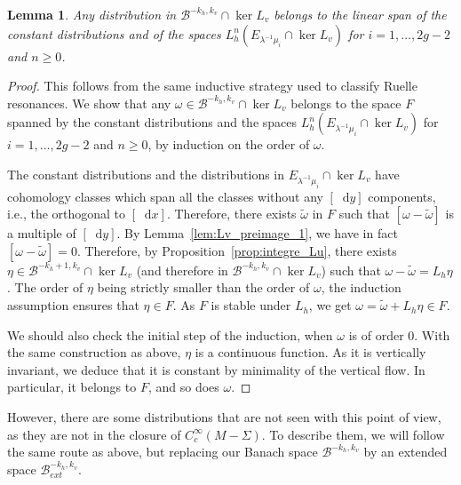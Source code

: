 \documentclass[11pt, a4paper, oneside, final, pagebackref]{amsart}
\newcommand{\boB}{\mathcal{B}}
\newcommand{\dd}{\mathop{}\!\mathrm{d}}
\renewcommand{\geq}{\geqslant}
\newtheorem{lem}[thm]{Lemma}
\theoremstyle{definition}
\numberwithin{equation}{section}
\begin{document}
\begin{lem}
\label{lem:Lv_invariant_boB} Any distribution in $\boB^{-k_h, k_v} \cap \ker
L_v$ belongs to the linear span of the constant distributions and of the
spaces $L_h^n(E_{\lambda^{-1}\mu_i} \cap \ker L_v)$ for $i=1,\dotsc, 2g-2$
and $n\geq 0$.
\end{lem}
\begin{proof}
This follows from the same inductive strategy used to classify Ruelle
resonances. We show that any $\omega \in \boB^{-k_h, k_v} \cap \ker L_v$
belongs to the space $F$ spanned by the constant distributions and the spaces
$L_h^n(E_{\lambda^{-1}\mu_i} \cap \ker L_v)$ for $i=1,\dotsc, 2g-2$ and
$n\geq 0$, by induction on the order of $\omega$.

The constant distributions and the distributions in $E_{\lambda^{-1}\mu_i}
\cap \ker L_v$ have cohomology classes which span all the classes without any
$[\dd y]$ components, i.e., the orthogonal to $[\dd x]$. Therefore, there
exists $\tilde \omega$ in $F$ such that $[\omega - \tilde \omega]$ is a
multiple of $[\dd y]$. By Lemma~\ref{lem:Lv_preimage_1}, we have in fact
$[\omega - \tilde \omega] = 0$. Therefore, by
Proposition~\ref{prop:integre_Lu}, there exists $\eta \in \boB^{-k_h+1, k_v}
\cap \ker L_v$ (and therefore in $\boB^{-k_h, k_v} \cap \ker L_v$) such that
$\omega-\tilde \omega = L_h \eta$. The order of $\eta$ being strictly smaller
than the order of $\omega$, the induction assumption ensures that $\eta \in
F$. As $F$ is stable under $L_h$, we get $\omega = \tilde \omega + L_h \eta
\in F$.

We should also check the initial step of the induction, when $\omega$ is of
order $0$. With the same construction as above, $\eta$ is a continuous
function. As it is vertically invariant, we deduce that it is constant by
minimality of the vertical flow. In particular, it belongs to $F$, and so
does $\omega$.
\end{proof}

However, there are some distributions that are not seen with this point of
view, as they are not in the closure of $C^\infty_c(M-\Sigma)$. To describe
them, we will follow the same route as above, but replacing our Banach space
$\boB^{-k_h, k_v}$ by an extended space $\boB_{ext}^{-k_h, k_v}$.
\end{document}

